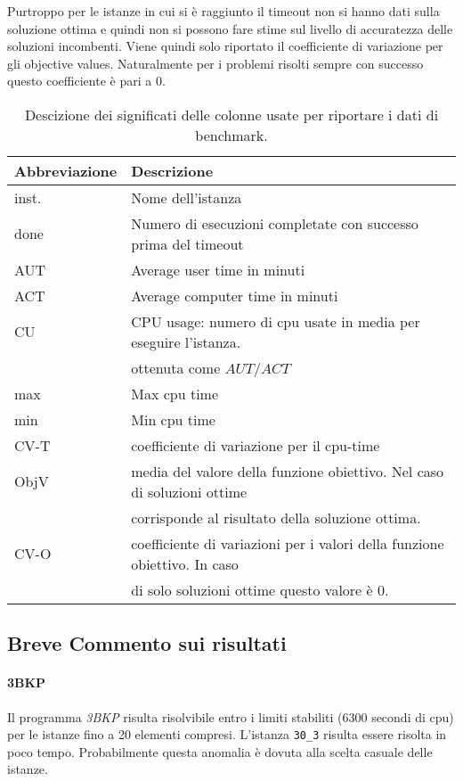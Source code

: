 Purtroppo per le istanze in cui si è raggiunto il timeout non si hanno dati
sulla soluzione ottima e quindi non si possono 
fare stime sul livello di accuratezza delle soluzioni incombenti.
Viene quindi solo riportato il coefficiente di variazione per gli
objective values. Naturalmente 
per i problemi risolti sempre con successo questo coefficiente è pari a $0$.

\begin{table}
\centering
\small
\begin{tabular}{| l| l |}
\hline
Abbreviazione & Descrizione \\
\hline
inst. & Nome dell'istanza \\
done & Numero di esecuzioni completate con successo prima del timeout\\
AUT & Average user time in minuti \\
ACT & Average computer time in minuti\\
CU  & CPU usage: numero di cpu usate in media per eseguire l'istanza. \\
	& ottenuta come $AUT/ACT$\\
max & Max cpu time \\
min & Min cpu time \\
CV-T & coefficiente di variazione per il cpu-time \\
ObjV & media del valore della funzione obiettivo. Nel caso di soluzioni ottime \\
	& corrisponde al risultato della soluzione ottima.\\
CV-O & coefficiente di variazioni per i valori della funzione obiettivo. In caso \\
& di solo soluzioni ottime questo valore è $0$. \\
\hline
\end{tabular}
\caption{Descizione dei significati delle colonne usate per riportare i dati
di benchmark.}
\label{table:description}
\end{table}


\subsection{Breve Commento sui risultati}



\paragraph{3BKP}
Il programma \emph{3BKP} risulta risolvibile entro i limiti stabiliti ($6300$ secondi di cpu)
per le istanze fino a 20 elementi compresi. L'istanza \verb|30_3| risulta
essere risolta in poco tempo. Probabilmente questa anomalia è dovuta alla
scelta casuale delle istanze.

